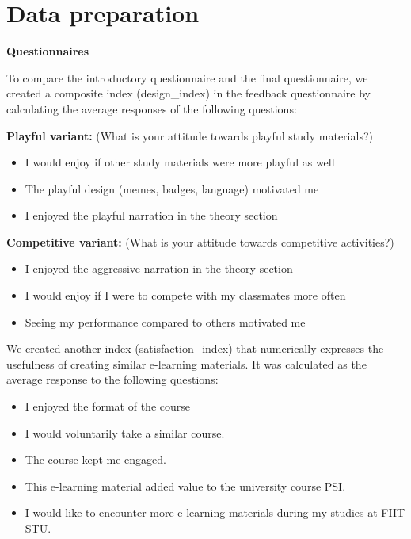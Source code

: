 \section{Data preparation \label{sec:data_prep}}


\textbf{Questionnaires}

To compare the introductory questionnaire and the final questionnaire, we created a composite index (design\_index) in the feedback questionnaire by calculating the average responses of the following questions:

\textbf{Playful variant:} (What is your attitude towards playful study materials?)
\begin{itemize}
    \item I would enjoy if other study materials were more playful as well
    \item The playful design (memes, badges, language) motivated me
    \item I enjoyed the playful narration in the theory section
\end{itemize}
\textbf{Competitive variant:} (What is your attitude towards competitive activities?)
\begin{itemize}
    \item I enjoyed the aggressive narration in the theory section
    \item I would enjoy if I were to compete with my classmates more often
    \item Seeing my performance compared to others motivated me
\end{itemize}

We created another index (satisfaction\_index) that numerically expresses the usefulness of creating similar e-learning materials. It was calculated as the average response to the following questions:
\begin{itemize}
    \item I enjoyed the format of the course	
    \item I would voluntarily take a similar course.
    \item The course kept me engaged.
    \item This e-learning material added value to the university course PSI.
    \item I would like to encounter more e-learning materials during my studies at FIIT STU.
\end{itemize}

